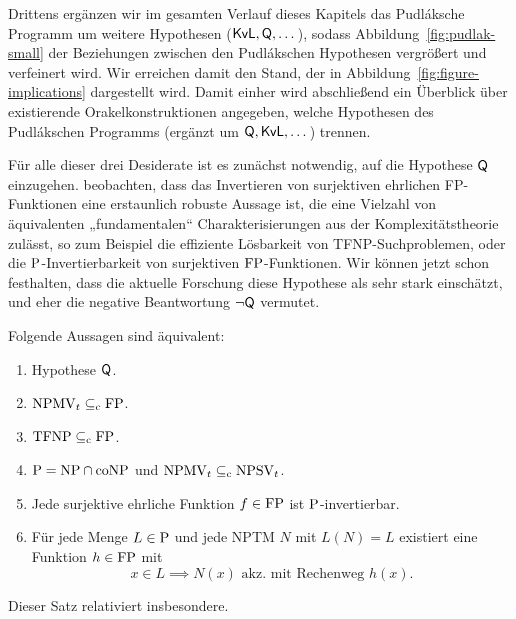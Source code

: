 
Drittens ergänzen wir im gesamten Verlauf dieses Kapitels das Pudláksche Programm um weitere Hypothesen ($\mathsf{KvL}, \hQ, \dots$), sodass Abbildung~\ref{fig:pudlak-small} der Beziehungen zwischen den Pudlákschen Hypothesen vergrößert und verfeinert wird. Wir erreichen damit den Stand, der in Abbildung~\ref{fig:figure-implications} dargestellt wird.
Damit einher wird abschließend ein Überblick über existierende Orakelkonstruktionen angegeben, welche Hypothesen des Pudlákschen Programms (ergänzt um $\hQ, \mathsf{KvL}, \dots$) trennen.


Für alle dieser drei Desiderate ist es zunächst notwendig, auf die Hypothese $\hQ$ einzugehen.
\textcite{fenner_inverting_2003} beobachten, dass das Invertieren von surjektiven ehrlichen FP-Funktionen eine erstaunlich robuste Aussage ist, die eine Vielzahl von äquivalenten „fundamentalen“ \parencite*[91]{fenner_inverting_2003} Charakterisierungen aus der Komplexitätstheorie zulässt, so zum Beispiel die effiziente Lösbarkeit von TFNP-Suchproblemen, oder die $\P$-Invertierbarkeit von surjektiven $\FP$-Funktionen. Wir können jetzt schon festhalten, dass die aktuelle Forschung diese Hypothese als sehr stark einschätzt, und eher die negative Beantwortung $\neg\hQ$ vermutet.


\begin{theorem}\label{thm:q-orig}
    Folgende Aussagen sind äquivalent:
    \begin{enumerate}
        \item Hypothese $\hQ$.
        \item $\mathrm{NPMV}_t\subseteqc \mathrm{FP}$.
        \item $\TFNP\subseteqc \mathrm{FP}$.
        \item $\P=\NP\cap\coNP$ und $\mathrm{NPMV}_t\subseteqc \mathrm{NPSV}_t$.
        \item Jede surjektive ehrliche Funktion $f\in\FP$ ist $\P$-invertierbar.
        \item Für jede Menge $L\in \P$  und jede NPTM $N$ mit $L(N)=L$ existiert eine Funktion $h\in \FP$ mit 
            \[ x\in L \implies N(x) \text{ akz. mit Rechenweg $h(x)$}. \]
    \end{enumerate}
\end{theorem}
Dieser Satz relativiert insbesondere.

